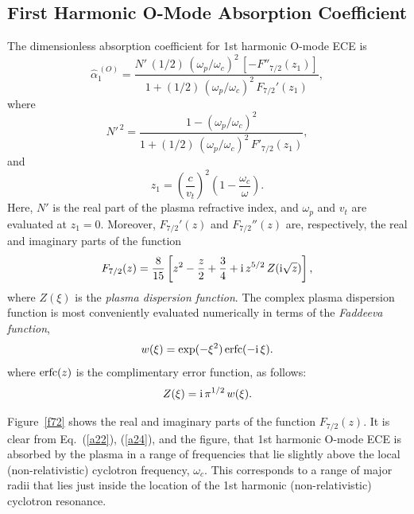 \documentclass[12pt,prb,aps]{revtex4-1}
\begin{document}
\subsection{First Harmonic O-Mode Absorption Coefficient} 
The dimensionless absorption coefficient for 1st harmonic O-mode ECE is\,\cite{bornatici}
\begin{equation}\label{a22}
\hat{\alpha}_1^{\,(O)}=\frac{N'\,(1/2)\,(\omega_p/\omega_c)^2\,[-F''_{7/2}(z_1)]}{1+(1/2)\,(\omega_p/\omega_c)^2\,F_{7/2}'(z_1)},
\end{equation}
where
\begin{equation}
N'^{\,2}=\frac{1-(\omega_p/\omega_c)^2}{1+(1/2)\,(\omega_p/\omega_c)^2\,F'_{7/2}(z_1)},
\end{equation}
and
\begin{equation}\label{a24}
z_1=\left(\frac{c}{v_t}\right)^2\left(1-\frac{\omega_c}{\omega}\right).
\end{equation}
Here, $N'$ is the real part of the plasma refractive index, and $\omega_p$ and $v_t$ are evaluated at $z_1=0$. Moreover,
$F_{7/2}'(z)$ and $F_{7/2}''(z)$ are, respectively,  the real and imaginary parts of
the function\,\cite{bornatici}
\begin{equation}
F_{7/2}(z) =\frac{8}{15}\left[z^2-\frac{z}{2}+\frac{3}{4}+{\rm i}\,z^{5/2}\,Z({\rm i}\sqrt{z})\right],
\end{equation}
where $Z(\xi)$ is the {\em plasma dispersion function}.\cite{plasma} The complex plasma dispersion function is most conveniently evaluated numerically 
in terms of the {\em Faddeeva function},\cite{faddeeva}
\begin{equation}
w(\xi) = \exp(-\xi^2)\,{\rm erfc}(-{\rm i}\,\xi).
\end{equation}
where ${\rm erfc}(z)$ is the complimentary error function,\cite{as} 
as follows:
\begin{equation}
Z(\xi)= {\rm i}\,\pi^{1/2}\,w(\xi).
\end{equation}

 Figure~\ref{f72} shows the real and imaginary parts of the function $F_{7/2}(z)$. It is clear from Eq.~(\ref{a22}),
(\ref{a24}), and the figure, that 1st harmonic O-mode  ECE is absorbed by the plasma in a range of frequencies that lie slightly above the local (non-relativistic) cyclotron frequency,
$\omega_c$. This corresponds to a range of major radii that lies just inside the location of the 1st harmonic (non-relativistic) cyclotron resonance. 
\end{document}
